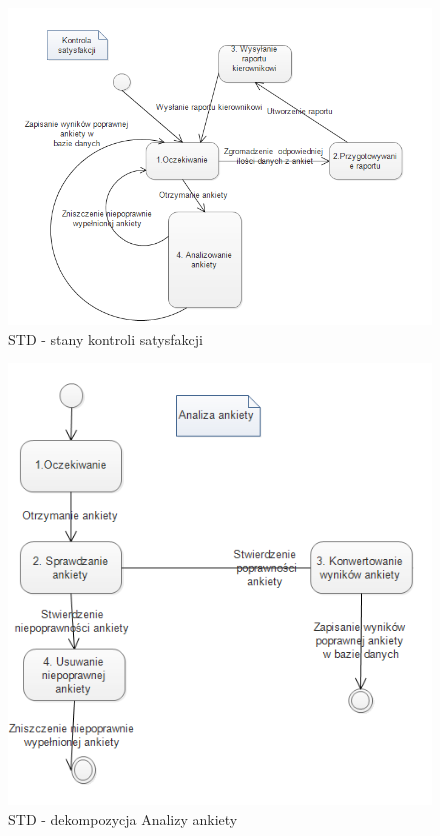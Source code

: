 \documentclass[a4paper, 11pt]{article}
\begin{document}
	\indent
	\begin{figure}[H]%
			\includegraphics[scale=1.0]{Img/STD-ankieta.png}
			\caption{STD - stany kontroli satysfakcji}
	\end{figure}
		\begin{figure}[H]%
			\includegraphics[scale=1.0]{Img/STD-ankieta2.png}
			\caption{STD - dekompozycja Analizy ankiety}
		\end{figure}
		
\end{document}
